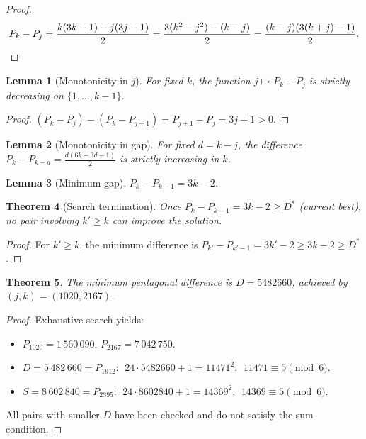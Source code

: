 \documentclass[12pt]{article}
\newtheorem{theorem}{Theorem}
\newtheorem{lemma}[theorem]{Lemma}
\begin{document}
\begin{proof}
\[
P_k - P_j = \frac{k(3k-1) - j(3j-1)}{2} = \frac{3(k^2-j^2) - (k-j)}{2} = \frac{(k-j)(3(k+j)-1)}{2}. \qedhere
\]
\end{proof}

\begin{lemma}[Monotonicity in $j$]
For fixed $k$, the function $j \mapsto P_k - P_j$ is strictly decreasing on $\{1, \ldots, k-1\}$.
\end{lemma}

\begin{proof}
$(P_k - P_j) - (P_k - P_{j+1}) = P_{j+1} - P_j = 3j + 1 > 0$.
\end{proof}

\begin{lemma}[Monotonicity in gap]
For fixed $d = k - j$, the difference $P_k - P_{k-d} = \frac{d(6k - 3d - 1)}{2}$ is strictly increasing in $k$.
\end{lemma}

\begin{lemma}[Minimum gap]
$P_k - P_{k-1} = 3k - 2$.
\end{lemma}

\begin{theorem}[Search termination]
Once $P_k - P_{k-1} = 3k - 2 \geq D^*$ (current best), no pair involving $k' \geq k$ can improve the solution.
\end{theorem}

\begin{proof}
For $k' \geq k$, the minimum difference is $P_{k'} - P_{k'-1} = 3k' - 2 \geq 3k - 2 \geq D^*$.
\end{proof}

\begin{theorem}
The minimum pentagonal difference is $D = 5482660$, achieved by $(j, k) = (1020, 2167)$.
\end{theorem}

\begin{proof}
Exhaustive search yields:
\begin{itemize}
    \item $P_{1020} = 1\,560\,090$, \quad $P_{2167} = 7\,042\,750$.
    \item $D = 5\,482\,660 = P_{1912}$: $\;24 \cdot 5482660 + 1 = 11471^2$, $\;11471 \equiv 5 \pmod{6}$.
    \item $S = 8\,602\,840 = P_{2395}$: $\;24 \cdot 8602840 + 1 = 14369^2$, $\;14369 \equiv 5 \pmod{6}$.
\end{itemize}
All pairs with smaller $D$ have been checked and do not satisfy the sum condition.
\end{proof}
\end{document}
